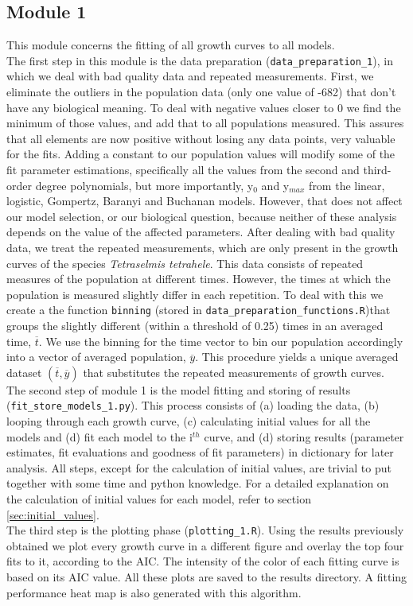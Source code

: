 \documentclass[titlepage,11pt]{article}
\begin{document}
\begin{linenumbers}
	\subsection{Module 1}
	This module concerns the fitting of all growth curves to all models.\\
	The first step in this module is the data preparation (\verb|data_preparation_1|), in which we deal with bad quality data and repeated measurements. First, we eliminate the outliers in the population data (only one value of -682) that don't have any biological meaning. To deal with negative values closer to 0 we find the minimum of those values, and add that to all populations measured. This assures that all elements are now positive without losing any data points, very valuable for the fits. Adding a constant to our population values will modify some of the fit parameter estimations, specifically all the values from the second and third-order degree polynomials, but more importantly, y$_0 $ and y$ _{max} $ from the linear, logistic, Gompertz, Baranyi and Buchanan models. However, that does not affect our model selection, or our biological question, because neither of these analysis depends on the value of the affected parameters. After dealing with bad quality data, we treat the repeated measurements, which are only present in the growth curves of the species  \textit{Tetraselmis tetrahele}. This data consists of repeated measures of the population at different times. However, the times at which the population is measured slightly  differ in each repetition. To deal with this we create a the function \verb|binning| (stored in \verb|data_preparation_functions.R|)that groups the slightly different (within a threshold of 0.25) times in an averaged time, $  \overline{t}$. We use the binning for the time vector to bin our population accordingly into a vector of averaged population, {$\overline{y}$}. This procedure yields a unique averaged dataset $ \left(\overline{t}, \overline{y}\right) $ that substitutes the repeated measurements of growth curves.\\
	The second step of module 1 is the model fitting and storing of results (\verb|fit_store_models_1.py|). This process consists of (a) loading the data, (b) looping through each growth curve, (c) calculating initial values for all the models and (d) fit each model to the i$ ^{th} $ curve, and (d) storing results (parameter estimates, fit evaluations and goodness of fit parameters) in dictionary for later analysis. All steps, except for the calculation of initial values, are trivial to put together with some time and python knowledge. For a detailed explanation on the calculation of initial values for each model, refer to section \ref{sec:initial_values}.\\
	The third step is the plotting phase (\verb|plotting_1.R|). Using the results previously obtained we plot every growth curve in a different figure and overlay the top four fits to it, according to the AIC. The intensity of the color of each fitting curve is based on its AIC value. All these plots are saved to the results directory. A fitting performance heat map is also generated with this algorithm.

\end{linenumbers}
\end{document}
